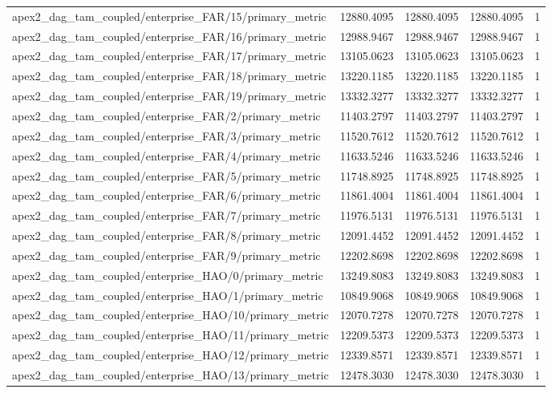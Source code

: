 \begin{table}[h]
\begin{tabular}{lrrrr}
apex2_dag_tam_coupled/enterprise_FAR/15/primary_metric & 12880.4095 & 12880.4095 & 12880.4095 & 1 \\
apex2_dag_tam_coupled/enterprise_FAR/16/primary_metric & 12988.9467 & 12988.9467 & 12988.9467 & 1 \\
apex2_dag_tam_coupled/enterprise_FAR/17/primary_metric & 13105.0623 & 13105.0623 & 13105.0623 & 1 \\
apex2_dag_tam_coupled/enterprise_FAR/18/primary_metric & 13220.1185 & 13220.1185 & 13220.1185 & 1 \\
apex2_dag_tam_coupled/enterprise_FAR/19/primary_metric & 13332.3277 & 13332.3277 & 13332.3277 & 1 \\
apex2_dag_tam_coupled/enterprise_FAR/2/primary_metric & 11403.2797 & 11403.2797 & 11403.2797 & 1 \\
apex2_dag_tam_coupled/enterprise_FAR/3/primary_metric & 11520.7612 & 11520.7612 & 11520.7612 & 1 \\
apex2_dag_tam_coupled/enterprise_FAR/4/primary_metric & 11633.5246 & 11633.5246 & 11633.5246 & 1 \\
apex2_dag_tam_coupled/enterprise_FAR/5/primary_metric & 11748.8925 & 11748.8925 & 11748.8925 & 1 \\
apex2_dag_tam_coupled/enterprise_FAR/6/primary_metric & 11861.4004 & 11861.4004 & 11861.4004 & 1 \\
apex2_dag_tam_coupled/enterprise_FAR/7/primary_metric & 11976.5131 & 11976.5131 & 11976.5131 & 1 \\
apex2_dag_tam_coupled/enterprise_FAR/8/primary_metric & 12091.4452 & 12091.4452 & 12091.4452 & 1 \\
apex2_dag_tam_coupled/enterprise_FAR/9/primary_metric & 12202.8698 & 12202.8698 & 12202.8698 & 1 \\
apex2_dag_tam_coupled/enterprise_HAO/0/primary_metric & 13249.8083 & 13249.8083 & 13249.8083 & 1 \\
apex2_dag_tam_coupled/enterprise_HAO/1/primary_metric & 10849.9068 & 10849.9068 & 10849.9068 & 1 \\
apex2_dag_tam_coupled/enterprise_HAO/10/primary_metric & 12070.7278 & 12070.7278 & 12070.7278 & 1 \\
apex2_dag_tam_coupled/enterprise_HAO/11/primary_metric & 12209.5373 & 12209.5373 & 12209.5373 & 1 \\
apex2_dag_tam_coupled/enterprise_HAO/12/primary_metric & 12339.8571 & 12339.8571 & 12339.8571 & 1 \\
apex2_dag_tam_coupled/enterprise_HAO/13/primary_metric & 12478.3030 & 12478.3030 & 12478.3030 & 1 \\

\end{tabular}
\end{table}
